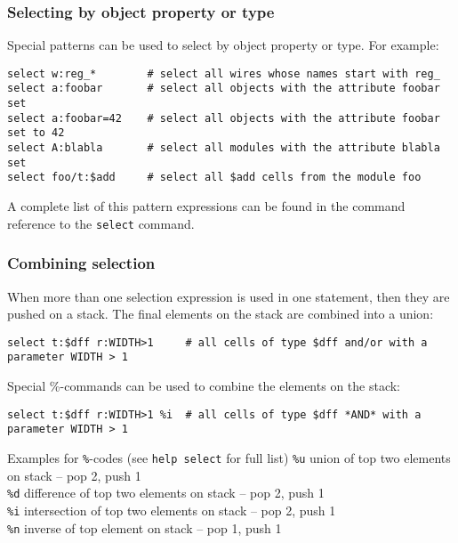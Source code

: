 \subsubsection{Selecting by object property or type}

\begin{frame}[fragile]{\subsubsecname}
Special patterns can be used to select by object property or type. For example:

\bigskip
\begin{lstlisting}[xleftmargin=0.5cm, basicstyle=\ttfamily\fontsize{8pt}{10pt}\selectfont, language=ys]
select w:reg_*        # select all wires whose names start with reg_
select a:foobar       # select all objects with the attribute foobar set
select a:foobar=42    # select all objects with the attribute foobar set to 42
select A:blabla       # select all modules with the attribute blabla set
select foo/t:$add     # select all $add cells from the module foo
\end{lstlisting}

\bigskip
A complete list of this pattern expressions can be found in the command
reference to the {\tt select} command.
\end{frame}

\subsubsection{Combining selection}

\begin{frame}[fragile]{\subsubsecname}
When more than one selection expression is used in one statement, then they are
pushed on a stack. The final elements on the stack are combined into a union:

\medskip
\begin{lstlisting}[xleftmargin=0.5cm, basicstyle=\ttfamily\fontsize{8pt}{10pt}\selectfont, language=ys]
select t:$dff r:WIDTH>1     # all cells of type $dff and/or with a parameter WIDTH > 1
\end{lstlisting}

\bigskip
Special \%-commands can be used to combine the elements on the stack:

\medskip
\begin{lstlisting}[xleftmargin=0.5cm, basicstyle=\ttfamily\fontsize{8pt}{10pt}\selectfont, language=ys]
select t:$dff r:WIDTH>1 %i  # all cells of type $dff *AND* with a parameter WIDTH > 1
\end{lstlisting}

\medskip
\begin{block}{Examples for {\tt \%}-codes (see {\tt help select} for full list)}
{\tt \%u} \dotfill union of top two elements on stack -- pop 2, push 1 \\
{\tt \%d} \dotfill difference of top two elements on stack -- pop 2, push 1 \\
{\tt \%i} \dotfill intersection of top two elements on stack -- pop 2, push 1 \\
{\tt \%n} \dotfill inverse of top element on stack -- pop 1, push 1 \\
\end{block}
\end{frame}

